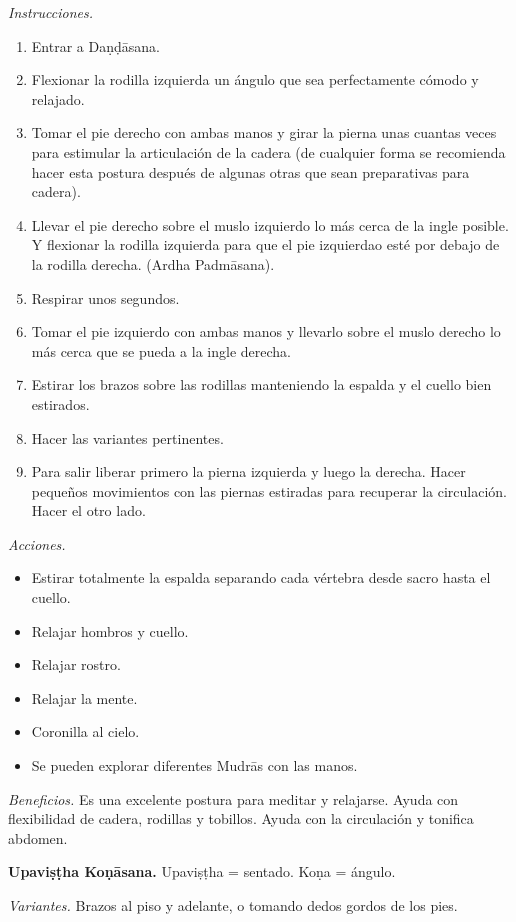 \emph{Instrucciones.}
\begin{enumerate}
\item Entrar a Daṇḍāsana.
\item Flexionar la rodilla izquierda un
ángulo que sea perfectamente cómodo y
relajado.
\item Tomar el pie derecho con ambas manos y
girar la pierna unas cuantas veces para
estimular la articulación de la cadera (de
cualquier forma se recomienda hacer esta
postura después de algunas otras que sean
preparativas para cadera).
\item Llevar el pie derecho sobre el muslo
izquierdo lo más cerca de la ingle posible. Y
flexionar la rodilla izquierda para que el
pie izquierdao esté por debajo de la rodilla
derecha. (Ardha Padmāsana).
\item Respirar unos segundos.
\item Tomar el pie izquierdo con ambas manos
y llevarlo sobre el muslo derecho lo más
cerca que se pueda a la ingle derecha.
\item Estirar los brazos sobre las rodillas
manteniendo la espalda y el cuello bien
estirados.
\item Hacer las variantes pertinentes.
\item Para salir liberar primero la pierna
izquierda y luego la derecha. Hacer pequeños
movimientos con las piernas estiradas para
recuperar la circulación. Hacer el otro lado.
\end{enumerate}

\emph{Acciones.}
\begin{itemize}
\item Estirar totalmente la espalda separando
cada vértebra desde sacro hasta el cuello.
\item Relajar hombros y cuello.
\item Relajar rostro.
\item Relajar la mente.
\item Coronilla al cielo.
\item Se pueden explorar diferentes Mudrās
con las manos.
\end{itemize}

\emph{Beneficios.} Es una excelente postura
para meditar y relajarse. Ayuda con
flexibilidad de cadera, rodillas y tobillos.
Ayuda con la circulación y tonifica abdomen.

\medskip\noindent\textbf{Upaviṣṭha Koṇāsana.}
Upaviṣṭha = sentado. Koṇa = ángulo.

\emph{Variantes.} Brazos al piso y adelante,
o tomando dedos gordos de los pies.

